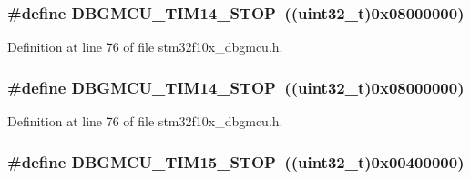 \subsubsection[{\texorpdfstring{D\+B\+G\+M\+C\+U\+\_\+\+T\+I\+M14\+\_\+\+S\+T\+OP}{DBGMCU_TIM14_STOP}}]{\setlength{\rightskip}{0pt plus 5cm}\#define D\+B\+G\+M\+C\+U\+\_\+\+T\+I\+M14\+\_\+\+S\+T\+OP~(({\bf uint32\+\_\+t})0x08000000)}\hypertarget{group___d_b_g_m_c_u___exported___constants_ga731f63d66045abee68dbc634070df051}{}\label{group___d_b_g_m_c_u___exported___constants_ga731f63d66045abee68dbc634070df051}


Definition at line 76 of file stm32f10x\+\_\+dbgmcu.\+h.

\subsubsection[{\texorpdfstring{D\+B\+G\+M\+C\+U\+\_\+\+T\+I\+M14\+\_\+\+S\+T\+OP}{DBGMCU_TIM14_STOP}}]{\setlength{\rightskip}{0pt plus 5cm}\#define D\+B\+G\+M\+C\+U\+\_\+\+T\+I\+M14\+\_\+\+S\+T\+OP~(({\bf uint32\+\_\+t})0x08000000)}\hypertarget{group___d_b_g_m_c_u___exported___constants_ga731f63d66045abee68dbc634070df051}{}\label{group___d_b_g_m_c_u___exported___constants_ga731f63d66045abee68dbc634070df051}


Definition at line 76 of file stm32f10x\+\_\+dbgmcu.\+h.

\subsubsection[{\texorpdfstring{D\+B\+G\+M\+C\+U\+\_\+\+T\+I\+M15\+\_\+\+S\+T\+OP}{DBGMCU_TIM15_STOP}}]{\setlength{\rightskip}{0pt plus 5cm}\#define D\+B\+G\+M\+C\+U\+\_\+\+T\+I\+M15\+\_\+\+S\+T\+OP~(({\bf uint32\+\_\+t})0x00400000)}\hypertarget{group___d_b_g_m_c_u___exported___constants_ga68f2b4e7feb0a1f1e4b437a104c30f03}{}\label{group___d_b_g_m_c_u___exported___constants_ga68f2b4e7feb0a1f1e4b437a104c30f03}


